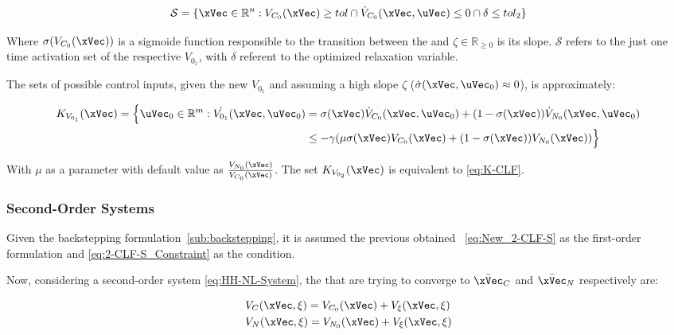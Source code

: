 \begin{equation}
    \mathcal{S} = \{\xVec \in \mathbb{R}^n: V_{C_0}(\xVec) \geq tol \cap \dot{V}_{C_0}(\xVec, \uVec) \leq 0 \cap \delta \leq tol_2 \}
    \label{eq:New_2-CLF-S_actuationPhaseSet}
\end{equation}

Where \(\sigma(V_{C_0}(\xVec))\) is a sigmoide function responsible to the transition between the  and \(\zeta \in \mathbb{R}_{\geq 0}\) is its slope. \(\mathcal{S}\) refers to the just one time activation set of the respective  \(V_{0_1}\), with \(\delta\) referent to the   optimized relaxation variable. 

The sets of possible control inputs, given the new  \(V_{0_1}\) and assuming a high slope \(\zeta\) (\(\dot{\sigma}(\xVec, \uVec_0)\approx 0\)), is approximately:

\begin{align}
    K_{V_{0_1}}(\xVec) = \Bigl\{\uVec_0 \in \mathbb{R}^m: \dot{V_{0_1}}(\xVec, \uVec_0) &= \sigma(\xVec) \dot{V}_{C_0}(\xVec, \uVec_0)  + (1-\sigma(\xVec))\dot{V}_{N_0}(\xVec, \uVec_0) \notag \\
    &\leq -\gamma( \mu \sigma(\xVec) V_{C_0}(\xVec) + (1 - \sigma(\xVec))V_{N_0}(\xVec)  )\Bigr\}
    \label{eq:2-CLF-S_Constraint}
\end{align}

With \(\mu\) as a parameter with default value as \( \frac{V_{N_0}(\xVec)}{V_{C_0}(\xVec)} \). The set \(K_{V_{0_2}}(\xVec)\) is equivalent to \ref{eq:K-CLF}. \\

\subsubsection{Second-Order Systems}
\label{subsubsubsec:CLFs_Summed_Algorithm_2nd_order}

Given the backstepping formulation~\ref{sub:backstepping}, it is assumed the previous obtained ~\ref{eq:New_2-CLF-S} as the first-order formulation and \ref{eq:2-CLF-S_Constraint} as the condition.\par 
Now, considering a second-order system \ref{eq:HH-NL-System}, the  that are trying to converge to \(\bar{\xVec}_C\) and  \(\bar{\xVec}_N\) respectively are:


\begin{align}
    &V_C(\xVec, \xi) = V_{C_0}(\xVec) + V_{\xi}(\xVec, \xi) \label{eq:hh_current_clf}\\
    &V_N(\xVec, \xi) = V_{N_0}(\xVec) + V_{\xi}(\xVec, \xi) \label{eq:hh_next_clf}
\end{align}

